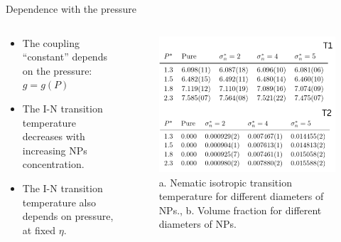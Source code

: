 \documentclass{beamer}
\begin{document}
\begin{frame}{Dependence with the pressure}
    \begin{columns}
        \begin{column}{0.5\textwidth}
        \begin{itemize}
            \item The coupling “constant” depends on the pressure:  $g = g(P)$
            \item The I-N transition temperature decreases with increasing NPs concentration.
            \item The I-N transition temperature also depends on pressure, at fixed $\eta $.
        \end{itemize}
        \end{column}
        \begin{column}{0.5\textwidth}
        \begin{figure}
            \centering
            \includegraphics[scale = 0.20]{Figures/P_Dep.png}
            \caption{{\scriptsize a. Nematic isotropic transition temperature for different diameters of NPs., b. Volume fraction for different diameters of NPs.}}
            \label{fig:enter-label}
        \end{figure}
        \end{column}
    \end{columns}
\end{frame}
\end{document}
